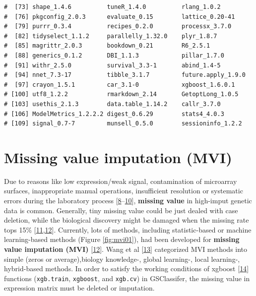 \documentclass[
  12pt,
]{book}
\newcommand{\passthrough}[1]{#1}
\begin{document}
\begin{lstlisting}
#  [73] shape_1.4.6          tuneR_1.4.0          rlang_1.0.2         
#  [76] pkgconfig_2.0.3      evaluate_0.15        lattice_0.20-41     
#  [79] purrr_0.3.4          recipes_0.2.0        processx_3.7.0      
#  [82] tidyselect_1.1.2     parallelly_1.32.0    plyr_1.8.7          
#  [85] magrittr_2.0.3       bookdown_0.21        R6_2.5.1            
#  [88] generics_0.1.2       DBI_1.1.3            pillar_1.7.0        
#  [91] withr_2.5.0          survival_3.3-1       abind_1.4-5         
#  [94] nnet_7.3-17          tibble_3.1.7         future.apply_1.9.0  
#  [97] crayon_1.5.1         car_3.1-0            xgboost_1.6.0.1     
# [100] utf8_1.2.2           rmarkdown_2.14       GetoptLong_1.0.5    
# [103] usethis_2.1.3        data.table_1.14.2    callr_3.7.0         
# [106] ModelMetrics_1.2.2.2 digest_0.6.29        stats4_4.0.3        
# [109] signal_0.7-7         munsell_0.5.0        sessioninfo_1.2.2
\end{lstlisting}

\hypertarget{missing-value-imputation-mvi}{%
\section{Missing value imputation (MVI)}\label{missing-value-imputation-mvi}}

Due to reasons like low expression/weak signal, contamination of microarray surfaces, inappropriate manual operations, insufficient resolution or systematic errors during the laboratory process {[}\protect\hyperlink{ref-RN387}{8}--\protect\hyperlink{ref-RN382}{10}{]}, \textbf{missing value} in high-imput genetic data is common. Generally, tiny missing value could be just dealed with case deletion, while the biological discovery might be damaged when the missing rate tops 15\% {[}\protect\hyperlink{ref-RN392}{11},\protect\hyperlink{ref-RN386}{12}{]}. Currently, lots of methods, including statistic-based or machine learning-based methods (Figure \ref{fig:mvi01}), had been developed for \textbf{missing value imputation (MVI)} {[}\protect\hyperlink{ref-RN386}{12}{]}. Wang et al {[}\protect\hyperlink{ref-RN384}{13}{]} categorized MVI methods into simple (zeros or average),biology knowledge-, global learning-, local learning-, hybrid-based methods. In order to satisfy the working conditions of xgboost {[}\protect\hyperlink{ref-xgboost}{14}{]} functions (\passthrough{\lstinline!xgb.train!}, \passthrough{\lstinline!xgboost!}, and \passthrough{\lstinline!xgb.cv!}) in GSClassifer, the missing value in expression matrix must be deleted or imputation.
\end{document}
